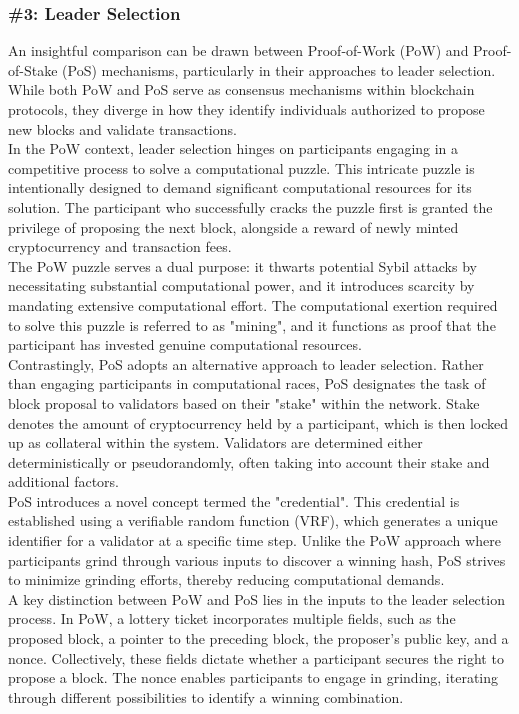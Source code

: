\subsubsection{\#3: Leader Selection}
An insightful comparison can be drawn between Proof-of-Work (PoW) and Proof-of-Stake (PoS) mechanisms, particularly in their approaches to leader selection. While both PoW and PoS serve as consensus mechanisms within blockchain protocols, they diverge in how they identify individuals authorized to propose new blocks and validate transactions.\\
In the PoW context, leader selection hinges on participants engaging in a competitive process to solve a computational puzzle. This intricate puzzle is intentionally designed to demand significant computational resources for its solution. The participant who successfully cracks the puzzle first is granted the privilege of proposing the next block, alongside a reward of newly minted cryptocurrency and transaction fees.\\
The PoW puzzle serves a dual purpose: it thwarts potential Sybil attacks by necessitating substantial computational power, and it introduces scarcity by mandating extensive computational effort. The computational exertion required to solve this puzzle is referred to as "mining", and it functions as proof that the participant has invested genuine computational resources.\\
Contrastingly, PoS adopts an alternative approach to leader selection. Rather than engaging participants in computational races, PoS designates the task of block proposal to validators based on their "stake" within the network. Stake denotes the amount of cryptocurrency held by a participant, which is then locked up as collateral within the system. Validators are determined either deterministically or pseudorandomly, often taking into account their stake and additional factors.\\
PoS introduces a novel concept termed the "credential". This credential is established using a verifiable random function (VRF), which generates a unique identifier for a validator at a specific time step. Unlike the PoW approach where participants grind through various inputs to discover a winning hash, PoS strives to minimize grinding efforts, thereby reducing computational demands.\\
A key distinction between PoW and PoS lies in the inputs to the leader selection process. In PoW, a lottery ticket incorporates multiple fields, such as the proposed block, a pointer to the preceding block, the proposer's public key, and a nonce. Collectively, these fields dictate whether a participant secures the right to propose a block. The nonce enables participants to engage in grinding, iterating through different possibilities to identify a winning combination.\\
